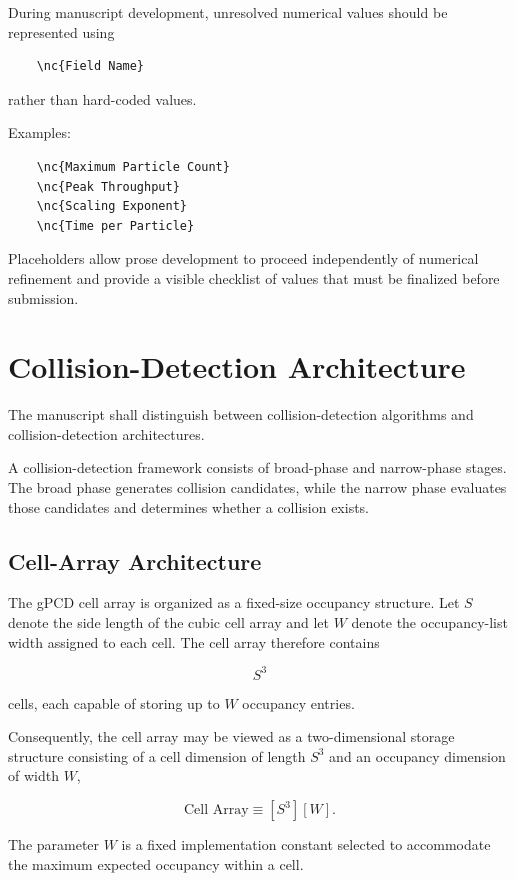 During manuscript development, unresolved numerical values should be
represented using
\begin{verbatim}
    \nc{Field Name}
\end{verbatim}
rather than hard-coded values.

Examples:
\begin{verbatim}
    \nc{Maximum Particle Count}
    \nc{Peak Throughput}
    \nc{Scaling Exponent}
    \nc{Time per Particle}
\end{verbatim}
Placeholders allow prose development to proceed independently of
numerical refinement and provide a visible checklist of values that
must be finalized before submission.
\section{Collision-Detection Architecture}

The manuscript shall distinguish between collision-detection algorithms
and collision-detection architectures.

A collision-detection framework consists of broad-phase and narrow-phase
stages. The broad phase generates collision candidates, while the
narrow phase evaluates those candidates and determines whether a
collision exists.

\subsection*{Cell-Array Architecture}

The gPCD cell array is organized as a fixed-size occupancy structure.
Let $S$ denote the side length of the cubic cell array and let $W$
denote the occupancy-list width assigned to each cell. The cell array
therefore contains

\begin{equation}
S^3
\end{equation}

cells, each capable of storing up to $W$ occupancy entries.

Consequently, the cell array may be viewed as a two-dimensional storage
structure consisting of a cell dimension of length $S^3$ and an
occupancy dimension of width $W$,

\begin{equation}
\text{Cell Array} \equiv [S^3][W].
\end{equation}

The parameter $W$ is a fixed implementation constant selected to
accommodate the maximum expected occupancy within a cell.

